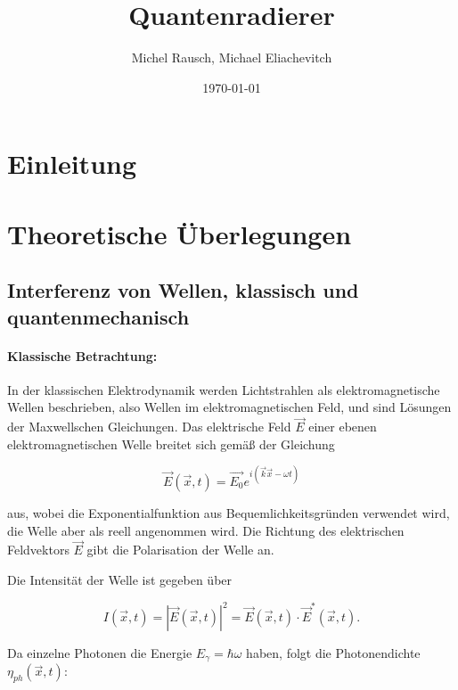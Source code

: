 \documentclass[a4paper,ngerman]{scrartcl}
\title{Quantenradierer}
\date{\today}
\author{Michel Rausch, Michael Eliachevitch}
\begin{document}
\maketitle
\tableofcontents
\thispagestyle{empty} %
\newpage
\setcounter{page}{1}

\section{Einleitung}
\label{sec:einleitung}


\section{Theoretische Überlegungen}
\label{sec:theorie}

\subsection{Interferenz von Wellen, klassisch und quantenmechanisch}
\label{sec:interferenz}

\paragraph{Klassische Betrachtung:}
\label{par:klass}
In der klassischen Elektrodynamik werden Lichtstrahlen als elektromagnetische Wellen beschrieben, also Wellen im elektromagnetischen Feld,
und sind Lösungen der Maxwellschen Gleichungen. Das elektrische Feld $\vec{E}$ einer ebenen elektromagnetischen Welle breitet sich gemäß der
Gleichung

\begin{equation}
\vec{E}(\vec{x},t) = \vec{E_0} e^{i(\vec{k}\vec{x}-\omega t)}
\end{equation}

aus, wobei die Exponentialfunktion aus Bequemlichkeitsgründen verwendet wird, die Welle aber
als reell angenommen wird. Die Richtung des elektrischen Feldvektors $\vec{E}$ gibt die Polarisation der Welle an.

Die Intensität der Welle ist gegeben über 

\begin{equation}
I(\vec{x},t) = |\vec{E}(\vec{x},t)|^2 = \vec{E}(\vec{x},t) \cdot \vec{E}^*(\vec{x},t).
\end{equation}

Da einzelne Photonen die Energie $E_\gamma = \hbar \omega$ haben, folgt die Photonendichte $\eta_{ph}(\vec{x},t)$:
\end{document}
